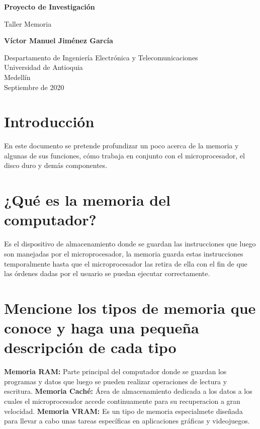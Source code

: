 \documentclass{article}
\begin{document}
\begin{titlepage}
    \begin{center}
        \vspace*{1cm}
            
        \Huge
        \textbf{Proyecto de Investigación}
            
        \vspace{0.5cm}
        \LARGE
        Taller Memoria
            
        \vspace{1.5cm}
            
        \textbf{Víctor Manuel Jiménez García}
            
        \vfill
            
        \vspace{0.8cm}
            
        \Large
        Despartamento de Ingeniería Electrónica y Telecomunicaciones\\
        Universidad de Antioquia\\
        Medellín\\
        Septiembre de 2020
            
    \end{center}
\end{titlepage}

\tableofcontents
\section{Introducción}
En este documento se pretende profundizar un poco acerca de la memoria y algunas de sus funciones, cómo trabaja en conjunto con el microprocesador, el disco duro y demás componentes.
\section{¿Qué es la memoria del computador?}
Es el dispositivo de almacenamiento donde se guardan las instrucciones que luego son manejadas por el microprocesador, la memoria guarda estas instrucciones temporalmente hasta que el microprocesador las retira de ella con el fin de que las órdenes dadas por el usuario se puedan ejecutar correctamente.
\cite{memoria}
\section{Mencione los tipos de memoria que conoce y haga una pequeña descripción de cada tipo} \label{contenido}
\textbf{Memoria RAM:} Parte principal del computador donde se guardan los programas y datos que luego se pueden realizar operaciones de lectura y escritura.
\textbf{Memoria Caché:} Área de almacenamiento dedicada a los datos a los cuales el microprocesador accede continuamente para su recuperacion a gran velocidad.
\textbf{Memoria VRAM:} Es un tipo de memoria especialmete diseñada para llevar a cabo unas tareas específicas en aplicaciones gráficas y videojuegos.
\cite{vram}
\end{document}
